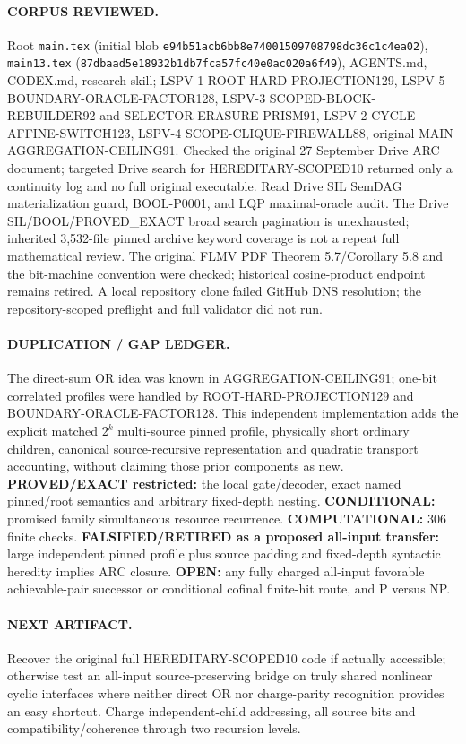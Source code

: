 \documentclass[11pt]{article}
\begin{document}
\paragraph{CORPUS REVIEWED.}
Root \texttt{main.tex} (initial blob \texttt{e94b51acb6bb8e74001509708798dc36c1c4ea02}),
\texttt{main13.tex} (\texttt{87dbaad5e18932b1db7fca57fc40e0ac020a6f49}),
AGENTS.md, CODEX.md, research skill; LSPV-1 ROOT-HARD-PROJECTION129,
LSPV-5 BOUNDARY-ORACLE-FACTOR128, LSPV-3 SCOPED-BLOCK-REBUILDER92
and SELECTOR-ERASURE-PRISM91, LSPV-2 CYCLE-AFFINE-SWITCH123,
LSPV-4 SCOPE-CLIQUE-FIREWALL88, original MAIN
AGGREGATION-CEILING91. Checked the original 27 September Drive ARC
document; targeted Drive search for HEREDITARY-SCOPED10 returned
only a continuity log and no full original executable. Read Drive
SIL SemDAG materialization guard, BOOL-P0001, and LQP maximal-oracle
audit. The Drive SIL/BOOL/PROVED\_EXACT broad search pagination is
unexhausted; inherited 3,532-file pinned archive keyword coverage
is not a repeat full mathematical review. The original FLMV PDF
Theorem 5.7/Corollary 5.8 and the bit-machine convention were
checked; historical cosine-product endpoint remains retired.
A local repository clone failed GitHub DNS resolution; the
repository-scoped preflight and full validator did not run.

\paragraph{DUPLICATION / GAP LEDGER.}
The direct-sum OR idea was known in AGGREGATION-CEILING91;
one-bit correlated profiles were handled by ROOT-HARD-PROJECTION129
and BOUNDARY-ORACLE-FACTOR128. This independent implementation adds
the explicit matched \(2^k\) multi-source pinned profile,
physically short ordinary children, canonical source-recursive
representation and quadratic transport accounting, without claiming
those prior components as new.
\textbf{PROVED/EXACT restricted:} the local gate/decoder, exact named
pinned/root semantics and arbitrary fixed-depth nesting.
\textbf{CONDITIONAL:} promised family simultaneous resource recurrence.
\textbf{COMPUTATIONAL:} 306 finite checks.
\textbf{FALSIFIED/RETIRED as a proposed all-input transfer:}
large independent pinned profile plus source padding and fixed-depth
syntactic heredity implies ARC closure.
\textbf{OPEN:} any fully charged all-input favorable achievable-pair
successor or conditional cofinal finite-hit route, and P versus NP.

\paragraph{NEXT ARTIFACT.}
Recover the original full HEREDITARY-SCOPED10 code if actually
accessible; otherwise test an all-input source-preserving bridge on
truly shared nonlinear cyclic interfaces where neither direct OR
nor charge-parity recognition provides an easy shortcut.
Charge independent-child addressing, all source bits and
compatibility/coherence through two recursion levels.
\end{document}
